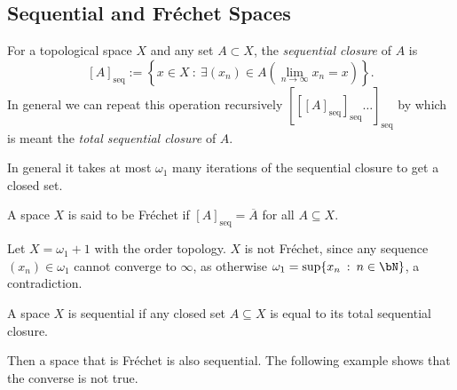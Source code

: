 \documentclass{article}
\newcommand{\seqcl}[1]{{[#1]_{\text{seq}}}}
\begin{document}
\subsection{Sequential and Fréchet Spaces}

\begin{defn}
    For a topological space \(X\) and any set \(A \subset X\), the \textit{sequential closure} of \(A\) is  
    \[
        \seqcl{A} := \left\{x \in X \: : \: \exists (x_n) \in A \left(\lim_{n\to \infty} x_n = x\right) \right\}.
    \]
    In general we can repeat this operation recursively \(\seqcl{\seqcl{\seqcl{A}}\dots}\) by which is meant the \textit{total sequential closure} of \(A\).
    
\end{defn}

\begin{fact}
    In general it takes at most \(\omega_1\) many iterations of the sequential closure to get a closed set. 
\end{fact}

\begin{defn}
    A space \(X\) is said to be Fréchet if \(\seqcl{A} = \overline{A}\) for all \(A \subseteq X\).
\end{defn}
\begin{exam}
    Let \(X = \omega_1 + 1\) with the order topology. \(X\) is not Fréchet, since any sequence \((x_n) \in \omega_1\) cannot converge to \(\infty\), as otherwise \(\omega_1 = \sup\{x_n \: : \: n \in \bN\}\), a contradiction.
\end{exam}
\begin{defn}
    A space \(X\) is sequential if any closed set \(A \subseteq X\) is equal to its total sequential closure.
\end{defn}
Then a space that is Fréchet is also sequential. The following example shows that the converse is not true.
\end{document}
